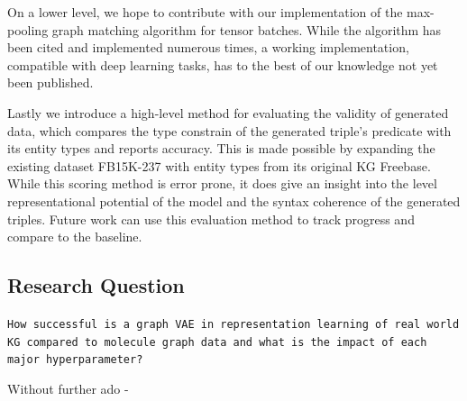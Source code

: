 On a lower level, we hope to contribute with our implementation of the max-pooling graph matching algorithm for tensor batches. While the algorithm has been cited and implemented numerous times, a working implementation, compatible with deep learning tasks, has to the best of our knowledge not yet been published.  

Lastly we introduce a high-level method for evaluating the validity of generated data, which compares the type constrain of the generated triple's predicate with its entity types and reports accuracy. This is made possible by expanding the existing dataset FB15K-237 with entity types from its original KG Freebase. While this scoring method is error prone, it does give an insight into the level representational potential of the model and the syntax coherence of the generated triples. Future work can use this evaluation method to track progress and compare to the baseline. 



\subsection{Research Question}

\begin{center}
    \texttt{How successful is a graph VAE in representation learning of real world KG compared to molecule graph data and what is the impact of each major hyperparameter?}
    \label{sec1:requestion}
\end{center}


Without further ado -
